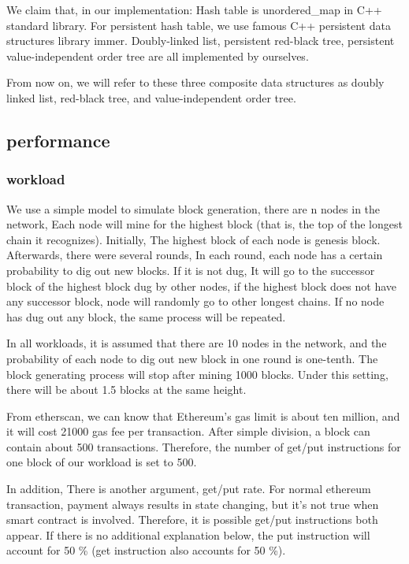 \documentclass[conference]{IEEEtran}
\begin{document}
We claim that, in our implementation:
Hash table is unordered\_map in C++ standard library.
For persistent hash table, we use famous C++
persistent data structures library immer.
Doubly-linked list, persistent red-black tree,
persistent value-independent order tree are all implemented by ourselves.

From now on, we will refer to these three composite data structures
as doubly linked list, red-black tree, and value-independent order tree.

\subsection{performance}

\subsubsection{workload}
We use a simple model to simulate block generation,
there are n nodes in the network,
Each node will mine for the highest block
(that is, the top of the longest chain it recognizes).
Initially, The highest block of each node
is genesis block. Afterwards, there were several rounds,
In each round, each node has a certain probability
to dig out new blocks. If it is not dug,
It will go to the successor block of the
highest block dug by other nodes,
if the highest block does not have any successor block,
node will randomly go to other longest chains.
If no node has dug out any block,
the same process will be repeated.

In all workloads, it is assumed that there
are 10 nodes in the network, and the probability
of each node to dig out new block in one round is one-tenth.
The block generating process will stop after mining 1000 blocks.
Under this setting, there will be about
1.5 blocks at the same height.

From etherscan, we can
know that Ethereum's gas limit is about ten million, and
it will cost 21000 gas fee per transaction.
After simple division, a block can contain about 500 transactions.
Therefore, the number of get/put instructions
for one block of our workload is set to 500.

In addition, There is another argument, get/put rate.
For normal ethereum transaction,
payment always results in state changing,
but it's not true when smart contract is involved.
Therefore, it is possible get/put instructions both appear.
If there is no additional explanation below,
the put instruction will account for 50 \% (get instruction also accounts for 50 \%).
\end{document}
